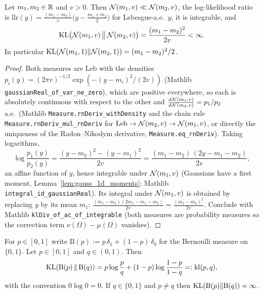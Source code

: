 \begin{lemma}\label{lem:kl_gaussian}
\leanok
{}
Let $m_1, m_2 \in \mathbb{R}$ and $v > 0$. Then $\mathcal{N}(m_1, v) \ll \mathcal{N}(m_2,v)$, the log-likelihood
ratio is $\mathrm{llr}(y) = \frac{(m_1 - m_2)}{v}\big(y - \frac{m_1+m_2}{2}\big)$ for Lebesgue-a.e.\
$y$, it is integrable, and
\[
  \mathrm{KL}\big(\mathcal{N}(m_1,v)\,\big\|\,\mathcal{N}(m_2,v)\big) = \frac{(m_1-m_2)^2}{2v} < \infty .
\]
In particular $\mathrm{KL}(\mathcal{N}(m_1,1)\|\mathcal{N}(m_2,1)) = (m_1-m_2)^2/2$.
\end{lemma}

\begin{proof}
\leanok
{}
Both measures are $\mathrm{Leb}$ with the densities
$p_i(y) = (2\pi v)^{-1/2}\exp(-(y-m_i)^2/(2v))$ (Mathlib \texttt{gaussianReal\_of\_var\_ne\_zero}),
which are positive everywhere, so each is absolutely continuous with respect to the other and
$\frac{d\mathcal{N}(m_1,v)}{d\mathcal{N}(m_2,v)} = p_1/p_2$ a.e.\ (Mathlib
\texttt{Measure.rnDeriv\_withDensity} and the chain rule \texttt{Measure.rnDeriv\_mul\_rnDeriv}
for $\mathrm{Leb} \to \mathcal{N}(m_2,v) \to \mathcal{N}(m_1,v)$, or directly the uniqueness of the
Radon--Nikodym derivative, \texttt{Measure.eq\_rnDeriv}). Taking logarithms,
\[
  \log\frac{p_1(y)}{p_2(y)} = \frac{(y-m_2)^2 - (y-m_1)^2}{2v}
  = \frac{(m_1-m_2)\,(2y - m_1 - m_2)}{2v} ,
\]
an affine function of $y$, hence integrable under $\mathcal{N}(m_1,v)$ (Gaussians have a first
moment, Lemma~\ref{lem:gauss_1d_moments}; Mathlib \texttt{integral\_id\_gaussianReal}). Its
integral under $\mathcal{N}(m_1,v)$ is obtained by replacing $y$ by its mean $m_1$:
$\frac{(m_1-m_2)(2m_1 - m_1 - m_2)}{2v} = \frac{(m_1-m_2)^2}{2v}$. Conclude with Mathlib
\texttt{klDiv\_of\_ac\_of\_integrable} (both measures are probability measures so the correction
term $\nu(\Omega)-\mu(\Omega)$ vanishes).
\end{proof}

\begin{lemma}[Divergence of two Bernoulli measures]\label{lem:pi_kl_bernoulli}
\leanok
For $p \in [0,1]$ write $\mathrm{B}(p) := p\,\delta_1 + (1-p)\,\delta_0$ for the Bernoulli
measure on $\{0,1\}$. Let $p \in [0,1]$ and $q \in (0,1)$. Then
\[
  \mathrm{KL}(\mathrm{B}(p)\,\|\,\mathrm{B}(q)) = p\log\frac{p}{q} + (1-p)\log\frac{1-p}{1-q}
  =: \mathrm{kl}(p,q),
\]
with the convention $0 \log 0 = 0$. If $q \in \{0,1\}$ and $p \ne q$ then
$\mathrm{KL}(\mathrm{B}(p)\|\mathrm{B}(q)) = \infty$.
\end{lemma}

